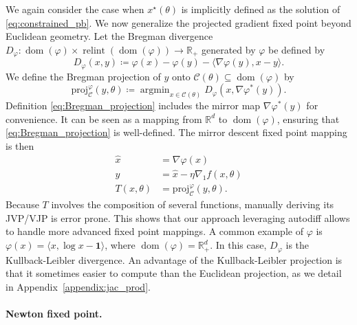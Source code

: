 \documentclass{article}
\def\cC{{\mathcal{C}}}
\def\RR{{\mathbb R}}
\def\proj{{\text{proj}}}
\DeclareMathOperator*{\argmin}{argmin}
\DeclareMathOperator*{\dom}{dom}
\DeclareMathOperator*{\relint}{relint}
\def\ones{{\mathbf{1}}}
\begin{document}
We again consider the case when $x^\star(\theta)$ is implicitly defined as the
solution of \eqref{eq:constrained_pb}.
We now generalize the projected gradient fixed point beyond Euclidean geometry.
Let the Bregman divergence $D_\varphi \colon \dom(\varphi) \times
\relint(\dom(\varphi)) \to \RR_+$ generated by $\varphi$ be defined by
\begin{equation}
D_\varphi(x, y) \coloneqq \varphi(x) - \varphi(y)
- \langle \nabla \varphi(y), x - y \rangle.
\end{equation}
We define the Bregman projection of $y$ onto $\cC(\theta) \subseteq \dom(\varphi)$
by
\begin{equation}
\proj_\cC^\varphi(y, \theta) \coloneqq
\argmin_{x \in \cC(\theta)} D_\varphi(x, \nabla \varphi^*(y)).
\label{eq:Bregman_projection}
\end{equation}
Definition \eqref{eq:Bregman_projection} includes the mirror map $\nabla
\varphi^*(y)$ for convenience. It can be seen as a mapping from $\RR^d$ to
$\dom(\varphi)$, ensuring that \eqref{eq:Bregman_projection} is well-defined.
The mirror descent fixed point mapping is then
\begin{align}
    \hat x &= \nabla \varphi(x) \\
    y &= \hat x - \eta \nabla_1 f(x, \theta) \\
    T(x, \theta) &= \proj_\cC^\varphi(y, \theta).
\label{eq:mirror_descent_fp}
\end{align}
Because $T$ involves the composition of several functions,
manually deriving its JVP/VJP is error prone. This shows that our approach
leveraging autodiff
allows to handle more advanced fixed point mappings.
%
A common example of $\varphi$ is $\varphi(x) = \langle x, \log x - \ones \rangle$,
where $\dom(\varphi) = \RR_+^d$. In this case, $D_\varphi$ is the
Kullback-Leibler divergence. An advantage of the Kullback-Leibler projection is
that it sometimes easier to compute than the Euclidean projection, as we detail
in Appendix~\ref{appendix:jac_prod}.

\paragraph{Newton fixed point.}
\end{document}
